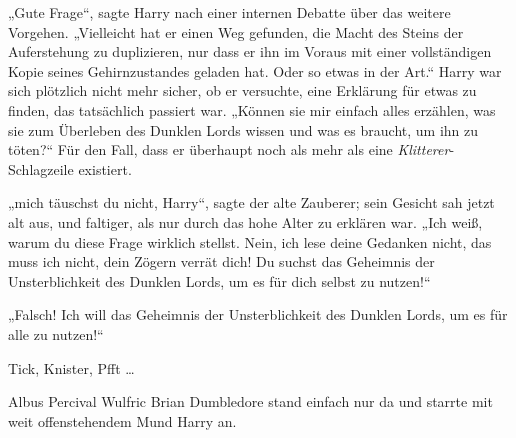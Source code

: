 „Gute Frage“, sagte Harry nach einer internen Debatte über das weitere Vorgehen.
„Vielleicht hat er einen Weg gefunden, die Macht des Steins der Auferstehung zu duplizieren, nur dass er ihn im Voraus mit einer vollständigen Kopie seines Gehirnzustandes geladen hat. Oder so etwas in der Art.“ Harry war sich plötzlich nicht mehr sicher, ob er versuchte, eine Erklärung für etwas zu finden, das tatsächlich passiert war.
„Können sie mir einfach alles erzählen, was sie zum Überleben des Dunklen Lords wissen und was es braucht, um ihn zu töten?“ Für den Fall, dass er überhaupt noch als mehr als eine \emph{Klitterer}-Schlagzeile existiert.

„mich täuschst du nicht, Harry“, sagte der alte Zauberer; sein Gesicht sah jetzt alt aus, und faltiger, als nur durch das hohe Alter zu erklären war.
„Ich weiß, warum du diese Frage wirklich stellst. Nein, ich lese deine Gedanken nicht, das muss ich nicht, dein Zögern verrät dich! Du suchst das Geheimnis der Unsterblichkeit des Dunklen Lords, um es für dich selbst zu nutzen!“

„Falsch! Ich will das Geheimnis der Unsterblichkeit des Dunklen Lords, um es für alle zu nutzen!“

\later

Tick, Knister, Pfft …

Albus Percival Wulfric Brian Dumbledore stand einfach nur da und starrte mit weit offenstehendem Mund Harry an.

